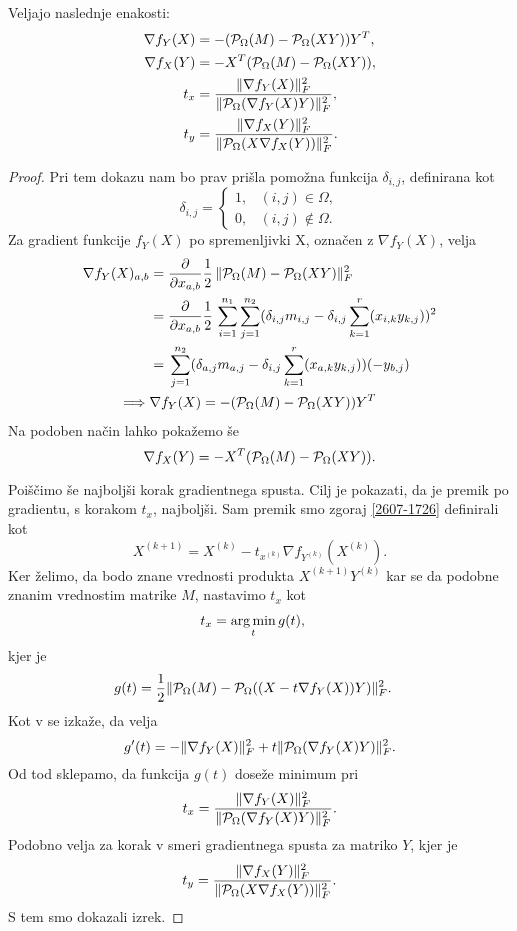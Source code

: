 \begin{theorem}
Veljajo naslednje enakosti:
\begin{align*}
    \nabla f_Y(X) &= -(\mathcal{P}_\Omega(M) - \mathcal{P}_\Omega(XY))Y^T,\\
    \nabla f_X(Y) &= -X^T (\mathcal{P}_\Omega(M) - \mathcal{P}_\Omega(XY)),\\
    t_x &= \frac{\lVert\nabla f_Y(X)\rVert_F^2}{\lVert\mathcal{P}_\Omega(\nabla f_Y(X)Y)\rVert_F^2},  \\
    t_y &= \frac{\lVert\nabla f_X(Y)\rVert_F^2}{\lVert\mathcal{P}_\Omega(X \nabla f_X(Y))\rVert_F^2}. 
\end{align*}
\end{theorem}

\begin{proof}
Pri tem dokazu nam bo prav prišla pomožna funkcija $\delta_{i, j}$, definirana kot
\[
    \delta_{i,j} = 
    \left\{
    \begin{array}{rl}
        1,& (i, j) \in \Omega, \\
        0,& (i, j) \notin \Omega.
    \end{array}
    \right.
\]
Za gradient funkcije $f_Y(X)$ po spremenljivki X, označen z $\nabla f_Y(X)$, velja
\begin{align*}
    \nabla f_Y(X)_{a,b} &= \frac{\partial}{\partial x_{a,b}} \frac{1}{2}\, \lVert\mathcal{P}_\Omega(M) - \mathcal{P}_\Omega(XY)\rVert_F^2  \\
    &= \frac{\partial}{\partial x_{a,b}} \frac{1}{2}\, \sum_{i=1}^{n_1}\sum_{j=1}^{n_2}(\delta_{i,j}m_{i,j} - \delta_{i,j}\sum_{k=1}^{r}(x_{i,k}y_{k,j}))^2  \\
    &= \, \sum_{j=1}^{n_2}(\delta_{a,j}m_{a,j} - \delta_{i,j}\sum_{k=1}^{r}(x_{a,k}y_{k,j}))(-y_{b,j}) \\
    \implies &\nabla f_Y(X) = -(\mathcal{P}_\Omega(M) - \mathcal{P}_\Omega(XY))Y^T
\end{align*}
Na podoben način lahko pokažemo še
\[
    \nabla f_X(Y) = -X^T (\mathcal{P}_\Omega(M) - \mathcal{P}_\Omega(XY)).
\]

Poiščimo še najboljši korak gradientnega spusta.
Cilj je pokazati, da je premik po gradientu, s korakom $t_x$, najboljši.
Sam premik smo zgoraj \eqref{2607-1726} definirali kot
\[
    X^{(k+1)} = X^{(k)} - t_{x^{(k)}} \nabla f_{Y^{(k)}}(X^{(k)}).
\]
Ker želimo, da bodo znane vrednosti produkta $X^{(k+1)}Y^{(k)}$ kar se da podobne znanim vrednostim matrike $M$, nastavimo $t_x$ kot 
\begin{align*}
    t_x &= \operatorname*{arg\,min}_t g(t),
\end{align*} kjer je
\begin{align*}
    g(t) &= \frac{1}{2} \lVert\mathcal{P}_\Omega(M) - \mathcal{P}_\Omega((X - t\nabla f_Y(X))Y)\rVert_F^2.
\end{align*}
Kot v \cite{AST-TK15} se izkaže, da velja
\[
  g'(t) = -\lVert\nabla f_Y(X)\rVert_F^2 + t\lVert\mathcal{P}_\Omega(\nabla f_Y(X)Y)\rVert_F^2. 
\]
Od tod sklepamo, da funkcija $g(t)$ doseže minimum pri 
\[
  t_x = \frac{\lVert\nabla f_Y(X)\rVert_F^2}{\lVert\mathcal{P}_\Omega(\nabla f_Y(X)Y)\rVert_F^2}.  
\]
Podobno velja za korak v smeri gradientnega spusta za matriko $Y$, kjer je
\[
  t_y = \frac{\lVert\nabla f_X(Y)\rVert_F^2}{\lVert\mathcal{P}_\Omega(X \nabla f_X(Y))\rVert_F^2}.  
\]
S tem smo dokazali izrek.
\end{proof}